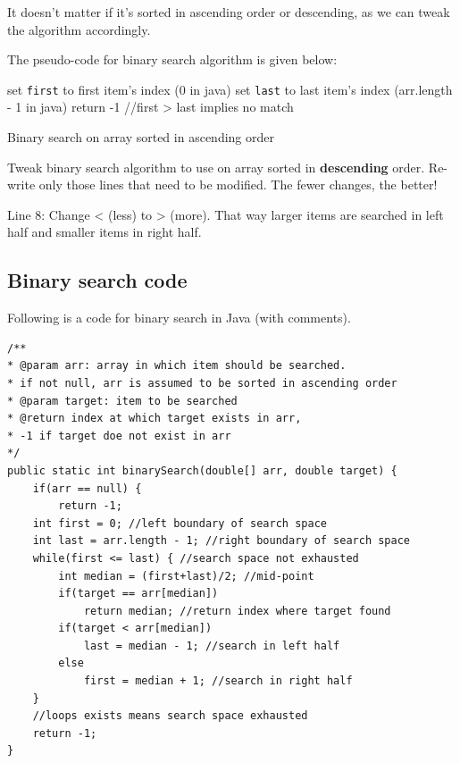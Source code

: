 It doesn't matter if it's sorted in ascending order or descending, as we can tweak the algorithm accordingly.

The pseudo-code for binary search algorithm is given below:

\IncMargin{1em}
\begin{algorithm}[H]
	\SetAlgoLined
{}
set \texttt{first} to first item's index (0 in java)\;
set \texttt{last} to last item's index (arr.length - 1 in java)\;
return -1 //first > last implies no match\;
\caption{Binary search on array sorted in ascending order \label{bs}}
\end{algorithm}

\begin{exercise}
Tweak binary search algorithm to use on array sorted in \textbf{descending} order. Re-write only those lines that need to be modified. The fewer changes, the better!
\end{exercise}
\begin{answer}
Line 8: Change < (less) to >	 (more). That way larger items are searched in left half and smaller items in right half.
\end{answer}

\newpage
\subsection{Binary search code}

Following is a code for binary search in Java (with comments).

\begin{lstlisting}[style=junit]
/**
* @param arr: array in which item should be searched.
* if not null, arr is assumed to be sorted in ascending order
* @param target: item to be searched
* @return index at which target exists in arr, 
* -1 if target doe not exist in arr
*/
public static int binarySearch(double[] arr, double target) {
	if(arr == null) {
		return -1;
	int first = 0; //left boundary of search space
	int last = arr.length - 1; //right boundary of search space
	while(first <= last) { //search space not exhausted
		int median = (first+last)/2; //mid-point
		if(target == arr[median])
			return median; //return index where target found
		if(target < arr[median])
			last = median - 1; //search in left half
		else
			first = median + 1; //search in right half
	}
	//loops exists means search space exhausted
	return -1;	
}
\end{lstlisting}


